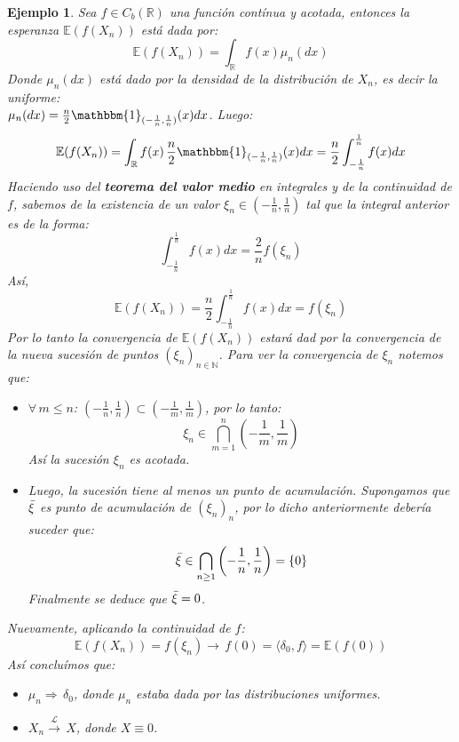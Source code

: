 \documentclass[a4paper]{article}
\newtheorem{ejemplo}{Ejemplo}
\numberwithin{equation}{subsection}
\def\R{\mathbb R}
\def\N{\mathbb N}
\def\E{\mathbb E}
\begin{document}
\begin{ejemplo}
Sea $f \in C_b(\R)$ una función contínua y acotada, entonces la esperanza $\E(f(X_n))$ está dada por:
\[\E(f(X_n)) = \int_{\R}f(x)\mu_n(dx)\]
Donde $\mu_n(dx)$ está dado por la densidad de la distribución de $X_n$, es decir la uniforme:\\ $\mu_n(dx) = \frac{n}{2} \mathbbm{1}_{(-\frac{1}{n},\frac{1}{n})}(x)dx$. Luego:
\[\E(f(X_n)) = \int_{\R}f(x)\,\frac{n}{2}\mathbbm{1}_{(-\frac{1}{n},\frac{1}{n})}(x)dx = \frac{n}{2}\int_{-\frac{1}{n}}^{\frac{1}{n}}f(x)dx\]
Haciendo uso del \textbf{teorema del valor medio} en integrales y de la continuidad de $f$, sabemos de la existencia de un valor $\xi_n \in (-\frac{1}{n},\frac{1}{n})$ tal que la integral anterior es de la forma:
\[\int_{-\frac{1}{n}}^{\frac{1}{n}}f(x)dx = \frac{2}{n}f(\xi_n)\]
Así,
\[\E(f(X_n)) = \frac{n}{2}\int_{-\frac{1}{n}}^{\frac{1}{n}}f(x)dx = f(\xi_n)\]
Por lo tanto la convergencia de $\E(f(X_n))$ estará dad por la convergencia de la nueva sucesión de puntos $(\xi_n)_{n\in\N}$. Para ver la convergencia de $\xi_n$ notemos que:
\begin{itemize}
    \item $\forall\,m\leq n$: $\left(-\frac{1}{n},\frac{1}{n}\right)\subset \left(-\frac{1}{m},\frac{1}{m}\right)$, por lo tanto:
    \[\xi_n \in \bigcap_{m=1}^{n}\left(-\frac{1}{m},\frac{1}{m}\right)\]
    Así la sucesión $\xi_n$ es acotada.
    \item Luego, la sucesión tiene al menos un punto de acumulación. Supongamos que $\Bar{\xi}$ es punto de acumulación de $(\xi_n)_n$, por lo dicho anteriormente debería suceder que:
    \[\Bar{\xi} \in \bigcap_{n\geq 1}\left(-\frac{1}{n},\frac{1}{n}\right) = \{0\}\]
    Finalmente se deduce que $\Bar{\xi}=0$.
\end{itemize}
Nuevamente, aplicando la continuidad de $f$:
\[\E(f(X_n)) = f(\xi_n) \rightarrow\,f(0) = \langle \delta_{0},f\rangle = \E(f(0))\]
\newpage
Así concluímos que:
\begin{itemize}
    \item $\mu_n \Rightarrow\,\delta_{0}$, donde $\mu_n$ estaba dada por las distribuciones uniformes.
    \item $X_n \xrightarrow{\mathcal{L}}\,X$, donde $X\equiv 0$.
\end{itemize}
\end{ejemplo}
\end{document}

